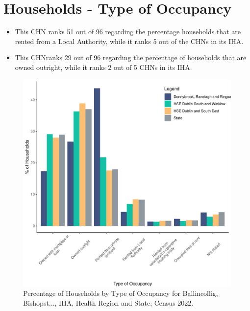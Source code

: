 \documentclass{article}
\begin{document}
\section{Households - Type of Occupancy}\label{sect:Households}
\begin{itemize}
\item This CHN ranks  51 out of 96 regarding the percentage households that are rented from a Local Authority, while it ranks  5 out of the CHNs in its IHA. 
\item This CHNranks  29 out of 96 regarding the percentage of households that are owned outright, while it ranks   2 out of 5 CHNs in its IHA.
\end{itemize}
\begin{figure}[H]
	\centering
	\includegraphics[width = 140mm]{../figures/HouseholdsED.pdf}
	\caption{Percentage of Households by Type of Occupancy for Ballincollig, Bishopst..., IHA, Health Region and State; Census 2022.}
	\label{fig:vbnv}
	\end{figure}
\end{document}
